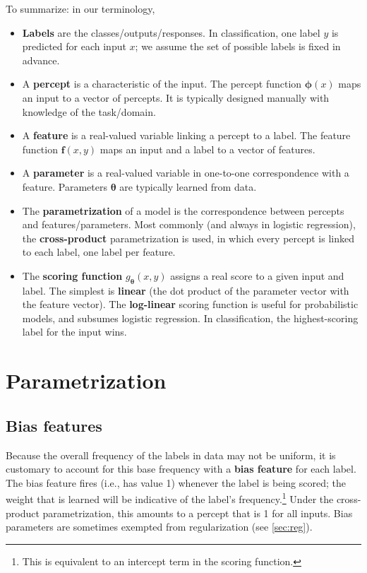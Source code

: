 \documentclass[11pt,letterpaper]{article}
\begin{document}
\noindent To summarize: in our terminology,
\begin{itemize}
  \item {\bf Labels} are the classes/outputs/responses. In classification, one label $y$ is predicted for each input $x$; 
  we assume the set of possible labels is fixed in advance.
  \item A {\bf percept} is a characteristic of the input. The percept function $\boldsymbol{\phi}(x)$ maps an input to a vector of percepts.
  It is typically designed manually with knowledge of the task/domain.
  \item A {\bf feature} is a real-valued variable linking a percept to a label. The feature function $\mathbf{f}(x,y)$ maps an input and a label to a vector of features.
  \item A {\bf parameter} is a real-valued variable in one-to-one correspondence with a feature. Parameters $\boldsymbol{\theta}$ are typically learned from data.
  \item The {\bf parametrization} of a model is the correspondence between percepts and features/parameters. 
  Most commonly (and always in logistic regression), the {\bf cross-product} parametrization is used, in which every percept is linked to each label, one label per feature.
  \item The {\bf scoring function} $g_{\boldsymbol{\theta}}(x,y)$ assigns a real score to a given input and label. 
  The simplest is {\bf linear} (the dot product of the parameter vector with the feature vector).
  The {\bf log-linear} scoring function is useful for probabilistic models, and subsumes logistic regression.
  In classification, the highest-scoring label for the input wins. 
\end{itemize}

\section{Parametrization}\label{sec:param}

\subsection{Bias features}\label{sec:bias}

Because the overall frequency of the labels in data may not be uniform, 
it is customary to account for this base frequency with a {\bf bias feature} 
for each label. The bias feature fires (i.e., has value 1) whenever 
the label is being scored; the weight that is learned will be indicative of 
the label's frequency.\footnote{This is equivalent to an intercept term in the scoring function.} 
Under the cross-product parametrization, this amounts to a percept that is 1 for all inputs.
Bias parameters are sometimes exempted from regularization (see \cref{sec:reg}).
\end{document}
